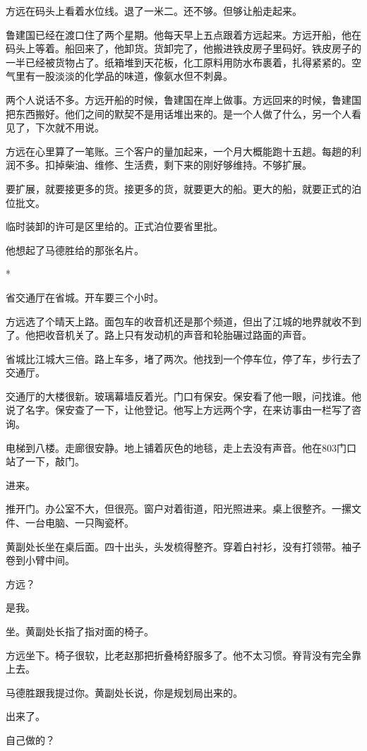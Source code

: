 \documentclass[UTF8,a5paper,11pt,openany]{ctexbook}
\newcommand{\scene}{\vspace{1em}\begin{center}*\quad*\quad*\end{center}\vspace{0.5em}}
\begin{document}
方远在码头上看着水位线。退了一米二。还不够。但够让船走起来。

鲁建国已经在渡口住了两个星期。他每天早上五点跟着方远起来。方远开船，他在码头上等着。船回来了，他卸货。货卸完了，他搬进铁皮房子里码好。铁皮房子的一半已经被货物占了。纸箱堆到天花板，化工原料用防水布裹着，扎得紧紧的。空气里有一股淡淡的化学品的味道，像氨水但不刺鼻。

两个人说话不多。方远开船的时候，鲁建国在岸上做事。方远回来的时候，鲁建国把东西搬好。他们之间的默契不是用话堆出来的。是一个人做了什么，另一个人看见了，下次就不用说。

方远在心里算了一笔账。三个客户的量加起来，一个月大概能跑十五趟。每趟的利润不多。扣掉柴油、维修、生活费，剩下来的刚好够维持。不够扩展。

要扩展，就要接更多的货。接更多的货，就要更大的船。更大的船，就要正式的泊位批文。

临时装卸的许可是区里给的。正式泊位要省里批。

他想起了马德胜给的那张名片。


\scene

省交通厅在省城。开车要三个小时。

方远选了个晴天上路。面包车的收音机还是那个频道，但出了江城的地界就收不到了。他把收音机关了。路上只有发动机的声音和轮胎碾过路面的声音。

省城比江城大三倍。路上车多，堵了两次。他找到一个停车位，停了车，步行去了交通厅。

交通厅的大楼很新。玻璃幕墙反着光。门口有保安。保安看了他一眼，问找谁。他说了名字。保安查了一下，让他登记。他写上方远两个字，在来访事由一栏写了咨询。

电梯到八楼。走廊很安静。地上铺着灰色的地毯，走上去没有声音。他在803门口站了一下，敲门。

进来。

推开门。办公室不大，但很亮。窗户对着街道，阳光照进来。桌上很整齐。一摞文件、一台电脑、一只陶瓷杯。

黄副处长坐在桌后面。四十出头，头发梳得整齐。穿着白衬衫，没有打领带。袖子卷到小臂中间。

方远？

是我。

坐。黄副处长指了指对面的椅子。

方远坐下。椅子很软，比老赵那把折叠椅舒服多了。他不太习惯。脊背没有完全靠上去。

马德胜跟我提过你。黄副处长说，你是规划局出来的。

出来了。

自己做的？
\end{document}
